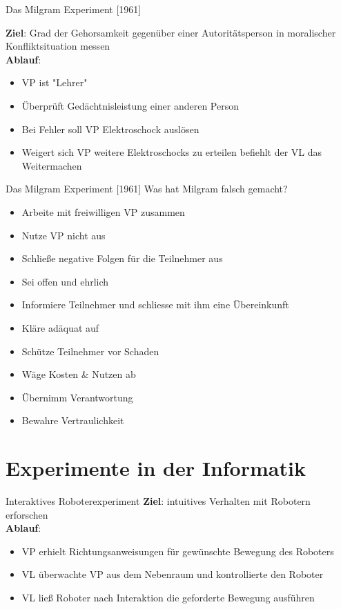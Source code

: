 \documentclass[10pt]{beamer}
\begin{document}
	\begin{frame}{Das Milgram Experiment [1961]}
		
		\textbf{Ziel}: Grad der Gehorsamkeit gegenüber einer Autoritätsperson in moralischer Konfliktsituation messen\\
		
		\textbf{Ablauf}:
		\begin{itemize}
			\item VP ist "Lehrer"
			\item Überprüft Gedächtnisleistung einer anderen Person
			\item Bei Fehler soll VP Elektroschock auslösen
			\item Weigert sich VP weitere Elektroschocks zu erteilen befiehlt der VL das Weitermachen
		\end{itemize}
		
	\end{frame}
	
	\begin{frame}{Das Milgram Experiment [1961]}
		Was hat Milgram falsch gemacht?
			\begin{itemize}
				\item Arbeite mit freiwilligen VP zusammen
				\item Nutze VP nicht aus
				\item Schließe negative Folgen für die Teilnehmer aus
				\item Sei offen und ehrlich
				\item Informiere Teilnehmer und schliesse mit ihm eine Übereinkunft
				\item Kläre adäquat auf
				\item Schütze Teilnehmer vor Schaden
				\item Wäge Kosten \& Nutzen ab
				\item Übernimm Verantwortung
				\item Bewahre Vertraulichkeit
			\end{itemize}
	\end{frame}

\section{Experimente in der Informatik}
	

	
	\begin{frame}{Interaktives Roboterexperiment}
		\textbf{Ziel}: intuitives Verhalten mit Robotern erforschen\\
		\vspace{0.8cm}
		\textbf{\textbf{Ablauf}}:
		\begin{itemize}
			\item VP erhielt Richtungsanweisungen für gewünschte Bewegung des Roboters
			\item VL überwachte VP aus dem Nebenraum und kontrollierte den Roboter
			\item VL ließ Roboter nach Interaktion die geforderte Bewegung ausführen
		\end{itemize}
	\end{frame}
	
\end{document}
